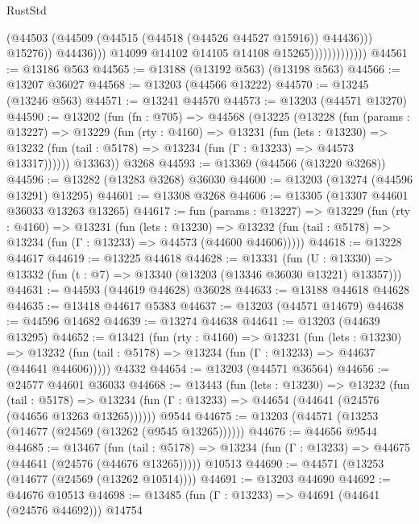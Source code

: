 \begin{lexlean}{RustStd}
\begin{coremodule}
                                        (@44503
                                          (@44509 (@44515 (@44518 (@44526 @44527 @15916)) @44436)))
                                        @15276))
                                    @44436)))
                              @14099
                              @14102
                              @14105
                              @14108
                              @15265)))))))))))))
@44561 := @13186 @563
@44565 := @13188 (@13192 @563) (@13198 @563)
@44566 := @13207 @36027
@44568 := @13203 (@44566 @13222)
@44570 := @13245 (@13246 @563)
@44571 := @13241 @44570
@44573 := @13203 (@44571 @13270)
@44590 := @13202
    (fun (fn : @705) =>
    @44568
      (@13225
        (@13228
          (fun (params : @13227) =>
          @13229
            (fun (rty : @4160) =>
            @13231
              (fun (lets : @13230) =>
              @13232 (fun (tail : @5178) => @13234 (fun (Γ : @13233) => @44573 @13317))))))
        @13363))
    @3268
@44593 := @13369 (@44566 (@13220 @3268))
@44596 := @13282 (@13283 @3268) @36030
@44600 := @13203 (@13274 (@44596 @13291) @13295)
@44601 := @13308 @3268
@44606 := @13305 (@13307 @44601 @36033 @13263 @13265)
@44617 := fun (params : @13227) =>
  @13229
    (fun (rty : @4160) =>
    @13231
      (fun (lets : @13230) =>
      @13232 (fun (tail : @5178) => @13234 (fun (Γ : @13233) => @44573 (@44600 @44606)))))
@44618 := @13228 @44617
@44619 := @13225 @44618
@44628 := @13331
    (fun (U : @13330) => @13332 (fun (t : @7) => @13340 (@13203 (@13346 @36030 @13221) @13357)))
@44631 := @44593 (@44619 @44628) @36028
@44633 := @13188 @44618 @44628
@44635 := @13418 @44617 @5383
@44637 := @13203 (@44571 @14679)
@44638 := @44596 @14682
@44639 := @13274 @44638
@44641 := @13203 (@44639 @13295)
@44652 := @13421
    (fun (rty : @4160) =>
    @13231
      (fun (lets : @13230) =>
      @13232 (fun (tail : @5178) => @13234 (fun (Γ : @13233) => @44637 (@44641 @44606)))))
    @4332
@44654 := @13203 (@44571 @36564)
@44656 := @24577 @44601 @36033
@44668 := @13443
    (fun (lets : @13230) =>
    @13232
      (fun (tail : @5178) =>
      @13234 (fun (Γ : @13233) => @44654 (@44641 (@24576 (@44656 @13263 @13265))))))
    @9544
@44675 := @13203 (@44571 (@13253 (@14677 (@24569 (@13262 (@9545 @13265))))))
@44676 := @44656 @9544
@44685 := @13467
    (fun (tail : @5178) => @13234 (fun (Γ : @13233) => @44675 (@44641 (@24576 (@44676 @13265)))))
    @10513
@44690 := @44571 (@13253 (@14677 (@24569 (@13262 @10514))))
@44691 := @13203 @44690
@44692 := @44676 @10513
@44698 := @13485 (fun (Γ : @13233) => @44691 (@44641 (@24576 @44692))) @14754

\end{coremodule}
\end{lexlean}
